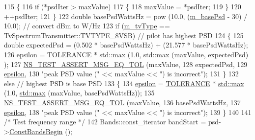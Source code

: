 \begin{DoxyCode}
115     \{
116       \textcolor{keywordflow}{if} (*psdIter > maxValue)
117         \{
118           maxValue = *psdIter;
119         \}
120       ++psdIter;
121     \}
122   \textcolor{keywordtype}{double} basePsdWattsHz = pow (10.0, (\hyperlink{classTvSpectrumTransmitterTestCase_a82db7da50d4e5f4087fa2dbf39d51582}{m\_basePsd} - 30) / 10.0); \textcolor{comment}{// convert dBm to W/Hz}
123   \textcolor{keywordflow}{if} (\hyperlink{classTvSpectrumTransmitterTestCase_a4f6d92198a3de6b3666f36b8692575f7}{m\_tvType} == TvSpectrumTransmitter::TVTYPE\_8VSB) \textcolor{comment}{// pilot has highest PSD}
124     \{
125       \textcolor{keywordtype}{double} expectedPsd = (0.502 * basePsdWattsHz) + (21.577 * basePsdWattsHz);
126       \hyperlink{tv-spectrum-transmitter-test_8cc_a4904cc82627458fdf6672ccc0b2802c7}{epsilon} = \hyperlink{tv-spectrum-transmitter-test_8cc_a89311a98397f9d6967d2cb10d5152d77}{TOLERANCE} * \hyperlink{80211b_8c_affe776513b24d84b39af8ab0930fef7f}{std::max} (1.0, \hyperlink{80211b_8c_affe776513b24d84b39af8ab0930fef7f}{std::max} (maxValue, expectedPsd)
      );
127       \hyperlink{group__testing_ga9e7861b56b4e70db3b56044cb7a28e41}{NS\_TEST\_ASSERT\_MSG\_EQ\_TOL} (maxValue, 
128                                  expectedPsd, 
129                                  \hyperlink{tv-spectrum-transmitter-test_8cc_a4904cc82627458fdf6672ccc0b2802c7}{epsilon},
130                                  \textcolor{stringliteral}{"peak PSD value ("} << maxValue << \textcolor{stringliteral}{") is incorrect"});
131     \}
132   \textcolor{keywordflow}{else} \textcolor{comment}{// highest PSD is base PSD}
133     \{
134       \hyperlink{tv-spectrum-transmitter-test_8cc_a4904cc82627458fdf6672ccc0b2802c7}{epsilon} = \hyperlink{tv-spectrum-transmitter-test_8cc_a89311a98397f9d6967d2cb10d5152d77}{TOLERANCE} * \hyperlink{80211b_8c_affe776513b24d84b39af8ab0930fef7f}{std::max} (1.0, \hyperlink{80211b_8c_affe776513b24d84b39af8ab0930fef7f}{std::max} (maxValue, 
      basePsdWattsHz));
135       \hyperlink{group__testing_ga9e7861b56b4e70db3b56044cb7a28e41}{NS\_TEST\_ASSERT\_MSG\_EQ\_TOL} (maxValue, 
136                                  basePsdWattsHz, 
137                                  \hyperlink{tv-spectrum-transmitter-test_8cc_a4904cc82627458fdf6672ccc0b2802c7}{epsilon}, 
138                                  \textcolor{stringliteral}{"peak PSD value ("} << maxValue << \textcolor{stringliteral}{") is incorrect"});
139     \}
140 
141   \textcolor{comment}{/* Test frequency range */}
142   Bands::const\_iterator bandStart = psd->\hyperlink{classns3_1_1SpectrumValue_aea610473acf55a7327dfd50938c7ded4}{ConstBandsBegin} ();

\end{DoxyCode}
